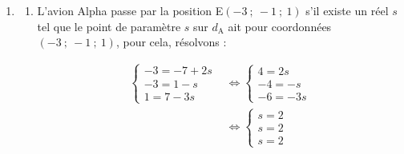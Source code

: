 \begin{enumerate}
\begin{enumerate}
\[
\begin{aligned}
	\begin{cases}
	-11+5t=-7+2s \\
	-5+t=1-s \\
	11-4t=7-3 s
	\end{cases}
	&\iff \begin{cases}
	-11+5 (6-s)=-7+2s \\
	t=6-s \\
	11-4(6-s)=7-3 s
	\end{cases}\\
	&\iff \begin{cases}
	-11+30-5s=-7+2s \\
	t=6-s \\
	11-24+4s=7-3 s
	\end{cases}\\
	&\iff \begin{cases}
	26=7s \\
	t=6-s \\
	7s=20
	\end{cases}\\
	&\iff \begin{cases}
	s=\dfrac{26}{7}\\
	t=6-s \\
	s=\dfrac{20}{7}
	\end{cases}
	\end{aligned}
	\]

Le système n'a pas de  solution, donc les deux avions ne peuvent pas rentrer en collision.
	\end{enumerate}
\item
	\begin{enumerate}
		\item L'avion Alpha passe par la position E$(-3~;~-1~;~1)$  s'il existe un réel $s$  tel que le point de paramètre $s$ sur $d_{\mathrm{A}}$ ait pour coordonnées $(-3~;~-1~;~1)$, pour cela, résolvons :

\[
\begin{aligned}
\begin{cases}
-3=-7+2s \\
-3=1-s \\
1=7-3 s
\end{cases}
	&\iff \begin{cases}
4=2s \\
-4=-s \\
-6=-3 s
\end{cases}\\
	&\iff \begin{cases}
s=2\\
s=2 \\
s=2
	\end{cases}
\end{aligned}
\]


\end{enumerate}
\end{enumerate}

